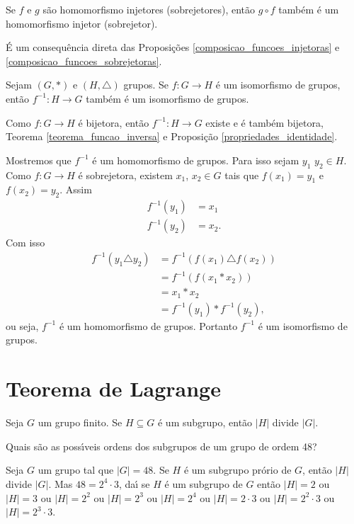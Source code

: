 \begin{corolario}
    Se $f$ e $g$ s\~ao homomorfismo injetores (sobrejetores), ent\~ao $g \circ f$ tamb\'em \'e um homomorfismo injetor (sobrejetor).
\end{corolario}
\begin{prova}
	\'E um consequ\^encia direta das Proposi\c{c}\~oes \eqref{composicao_funcoes_injetoras} e \eqref{composicao_funcoes_sobrejetoras}.
\end{prova}


\begin{proposicao}
    Sejam $(G, *)$ e $(H, \triangle)$ grupos. Se $f : G \to H$ \'e um isomorfismo de grupos, ent\~ao $f^{-1} : H \to G$ tamb\'em \'e um isomorfismo de grupos.
\end{proposicao}
\begin{prova}
	Como $f : G \to H$ \'e bijetora, ent\~ao $f^{-1} : H \to G$ existe e \'e tamb\'em bijetora, Teorema \eqref{teorema_funcao_inversa} e Proposi\c{c}\~ao \eqref{propriedades_identidade}.

	Mostremos que $f^{-1}$ \'e um homomorfismo de grupos. Para isso sejam $y_1$ $y_2 \in H$. Como $f : G \to H$ \'e sobrejetora, existem $x_1$, $x_2 \in G$ tais que $f(x_1) = y_1$ e $f(x_2) = y_ 2$. Assim
	\begin{align*}
		f^{-1}(y_1) &= x_1\\
		f^{-1}(y_2) &= x_2.
	\end{align*}
	Com isso
	\begin{align*}
		f^{-1}(y_1 \triangle y_2) &= f^{-1}(f(x_1) \triangle f(x_2)) \\ &= f^{-1}(f(x_1 * x_2)) \\ &= x_1 * x_2 \\ &= f^{-1}(y_1) * f^{-1}(y_2),
	\end{align*}
	ou seja, $f^{-1}$ \'e um homomorfismo de grupos.
	Portanto $f^{-1}$ \'e um isomorfismo de grupos.
\end{prova}


\section{Teorema de Lagrange}

\begin{teorema}\label{teorema_de_lagrange}
	Seja $G$ um grupo finito. Se $H\subseteq G$ {\'e} um subgrupo, ent{\~a}o $|H|$ divide $|G|$.
\end{teorema}

\begin{exemplo}
	Quais s{\~a}o as poss{\'\i}veis ordens dos subgrupos de um grupo de ordem 48?
	\begin{solucao}
		Seja $G$ um grupo tal que $|G|=48$. Se $H$ {\'e} um subgrupo pr\'orio de $G$, ent{\~a}o $|H|$ divide $|G|$. Mas $48=2^{4}\cdot 3$, da{\'\i} se $H$ \'e um subgrupo de $G$ ent\~ao $|H|=2$ ou $|H|=3$ ou $|H|= 2^{2}$ ou $|H|=2^{3}$ ou $|H|=2^{4}$ ou $|H|=2\cdot3$ ou $|H|=2^2\cdot 3$ ou $|H|=2^3\cdot 3$.
	\end{solucao}
\end{exemplo}

